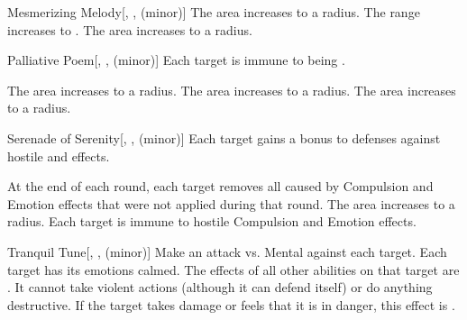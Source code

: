 {\begin{freeability}{Mesmerizing Melody}[, ,  (minor)]
                \rankline
                 The area increases to a \areamed radius.
                 The range increases to \rnglong.
                 The area increases to a \arealarge radius.
            \end{freeability}

            \begin{freeability}{Palliative Poem}[, ,  (minor)]
                Each target is immune to being .

                \rankline
                 The area increases to a \arealarge radius.
                 The area increases to a \areahuge radius.
                 The area increases to a \areaext radius.
            \end{freeability}

            \begin{freeability}{Serenade of Serenity}[, ,  (minor)]
                Each target gains a  bonus to defenses against hostile  and  effects.

                \rankline
                 At the end of each round, each target removes all  caused by Compulsion and Emotion effects that were not applied during that round.
                 The area increases to a \areahuge radius.
                 Each target is immune to hostile Compulsion and Emotion effects.
            \end{freeability}

            \begin{freeability}{Tranquil Tune}[, ,  (minor)]
                Make an attack vs. Mental against each target.
                \hit Each target has its emotions calmed.
                The effects of all other  abilities on that target are .
                It cannot take violent actions (although it can defend itself) or do anything destructive.
                If the target takes damage or feels that it is in danger, this effect is .


\end{freeability}}
